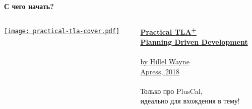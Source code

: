 \documentclass[
  11pt,aspectratio=169,pdf,hyperref={unicode,colorlinks=false}
]{beamer}
\def\TLA{TLA\textsuperscript{+}}
\begin{document}
\begin{frame}
  \centering\Large\bf{С чего начать?}
\end{frame}

\begin{frame}[c]
  \begin{columns}
    \begin{column}{.47\textwidth}
      \begin{minipage}[c][0.75\textheight][c]{\columnwidth}
        \centering%
        \href{https://www.apress.com/gp/book/9781484238288}{%
          \texttt{[image: practical-tla-cover.pdf]}
        }%
      \end{minipage}%
    \end{column}
    \begin{column}{.47\textwidth}%
      \begin{minipage}[c][0.75\textheight][s]{\columnwidth}
        \href{https://www.apress.com/gp/book/9781484238288}{%
        {\Large\bf Practical \TLA}\\
        {\large\bf Planning Driven Development}\\%
        \\%
        {\normalsize by Hillel Wayne\\Apress, 2018}
      }\\%
      \\%
      {\large Только про PlusCal,\\%
      идеально для вхождения в тему!}\\%
      \vfill%
      \href{https://www.apress.com/gp/book/9781484238288}{%
      }
    \end{minipage}
    \end{column}
  \end{columns}
\end{frame}
\end{document}
